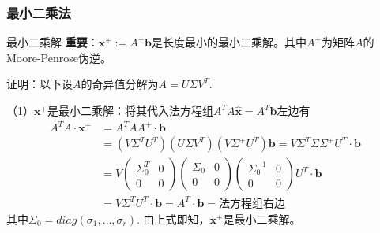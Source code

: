 \begin{frame}
\frametitle{最小二乘法}

\begin{block}{最小二乘解}
{\bfseries 重要}：$\mathbf{x}^+ := A^+\mathbf{b}$是长度最小的最小二乘解。其中$A^+$为矩阵$A$的Moore-Penrose伪逆。

\vspace{1em}
\pause

证明：以下设$A$的奇异值分解为$A = U\Sigma V^T$.

（1）$\mathbf{x}^+$是最小二乘解：将其代入法方程组$A^TA\widehat{\mathbf{x}} = A^T\mathbf{b}$左边有
\begin{align*}
A^TA\cdot\mathbf{x}^+ & = A^TAA^+ \cdot \mathbf{b} \\
& = (V\Sigma^TU^T)(U\Sigma V^T)(V\Sigma^+ U^T) \mathbf{b} = V\Sigma^T\Sigma\Sigma^+ U^T \cdot \mathbf{b} \\
& = V \begin{pmatrix} \Sigma_0^T & 0 \\ 0 & 0 \end{pmatrix} \begin{pmatrix} \Sigma_0 & 0 \\ 0 & 0 \end{pmatrix} \begin{pmatrix} \Sigma_0^{-1} & 0 \\ 0 & 0 \end{pmatrix} U^T \cdot \mathbf{b} \\
& = V \Sigma^T U^T \cdot \mathbf{b} = A^T \cdot \mathbf{b} = \text{法方程组右边}
\end{align*}
其中$\Sigma_0 = diag(\sigma_1, \ldots, \sigma_r)$. 由上式即知，$\mathbf{x}^+$是最小二乘解。
\end{block}

\end{frame}


